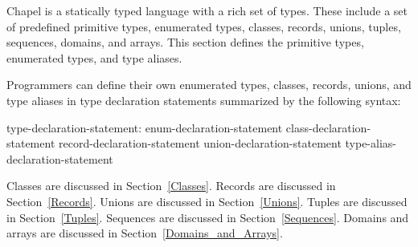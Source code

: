 Chapel is a statically typed language with a rich set of types.  These
include a set of predefined primitive types, enumerated types,
classes, records, unions, tuples, sequences, domains, and arrays.
This section defines the primitive types, enumerated types, and type
aliases.

Programmers can define their own enumerated types, classes, records,
unions, and type aliases in type declaration statements summarized by
the following syntax:
\begin{syntax}
type-declaration-statement:
  enum-declaration-statement
  class-declaration-statement
  record-declaration-statement
  union-declaration-statement
  type-alias-declaration-statement
\end{syntax}

Classes are discussed in Section~\ref{Classes}.  Records are discussed
in Section~\ref{Records}.  Unions are discussed in
Section~\ref{Unions}.  Tuples are discussed in Section~\ref{Tuples}.
Sequences are discussed in Section~\ref{Sequences}.  Domains and
arrays are discussed in Section~\ref{Domains_and_Arrays}.

